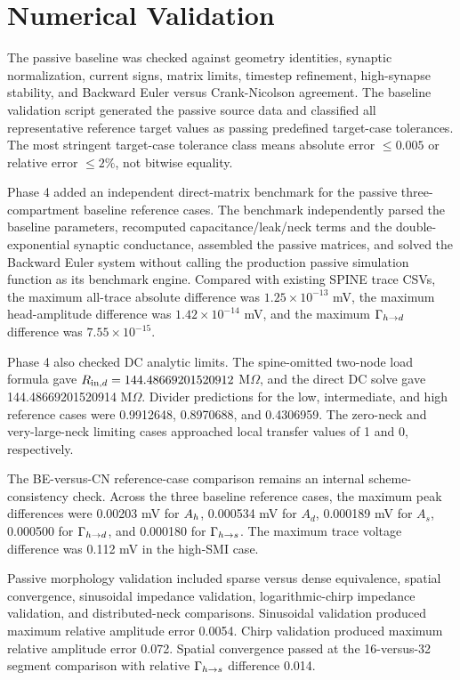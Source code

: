 \section{Numerical Validation}

The passive baseline was checked against geometry identities, synaptic normalization, current signs, matrix limits, timestep refinement, high-synapse stability, and Backward Euler versus Crank-Nicolson agreement. The baseline validation script generated the passive source data and classified all representative reference target values as passing predefined target-case tolerances. The most stringent target-case tolerance class means absolute error $\leq0.005$ or relative error $\leq2\%$, not bitwise equality.

Phase 4 added an independent direct-matrix benchmark for the passive three-compartment baseline reference cases. The benchmark independently parsed the baseline parameters, recomputed capacitance/leak/neck terms and the double-exponential synaptic conductance, assembled the passive matrices, and solved the Backward Euler system without calling the production passive simulation function as its benchmark engine. Compared with existing SPINE trace CSVs, the maximum all-trace absolute difference was $1.25\times10^{-13}$ mV, the maximum head-amplitude difference was $1.42\times10^{-14}$ mV, and the maximum $\Gamma_{h\rightarrow d}$ difference was $7.55\times10^{-15}$.

Phase 4 also checked DC analytic limits. The spine-omitted two-node load formula gave $R_{\mathrm{in},d}=144.48669201520912$ M$\Omega$, and the direct DC solve gave 144.48669201520914 M$\Omega$. Divider predictions for the low, intermediate, and high reference cases were 0.9912648, 0.8970688, and 0.4306959. The zero-neck and very-large-neck limiting cases approached local transfer values of 1 and 0, respectively.

The BE-versus-CN reference-case comparison remains an internal scheme-consistency check. Across the three baseline reference cases, the maximum peak differences were 0.00203 mV for $A_h$, 0.000534 mV for $A_d$, 0.000189 mV for $A_s$, 0.000500 for $\Gamma_{h\rightarrow d}$, and 0.000180 for $\Gamma_{h\rightarrow s}$. The maximum trace voltage difference was 0.112 mV in the high-SMI case.

Passive morphology validation included sparse versus dense equivalence, spatial convergence, sinusoidal impedance validation, logarithmic-chirp impedance validation, and distributed-neck comparisons. Sinusoidal validation produced maximum relative amplitude error 0.0054. Chirp validation produced maximum relative amplitude error 0.072. Spatial convergence passed at the 16-versus-32 segment comparison with relative $\Gamma_{h\rightarrow s}$ difference 0.014.


